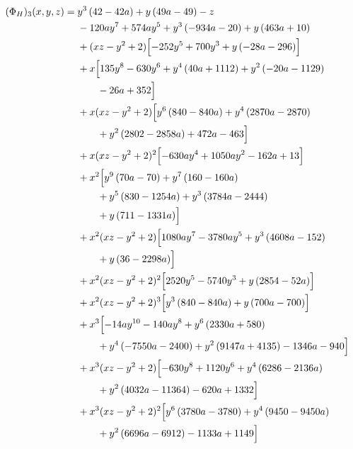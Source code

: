 \begingroup\footnotesize\allowdisplaybreaks[4]

\begin{align*}
(\Phi_H)_3(x,y,z)={}&y^{3} \left(42 - 42 a\right) + y \left(49 a - 49\right) - z\\
&{}- 120 a y^{7} + 574 a y^{5} + y^{3} \left(- 934 a - 20\right) + y \left(463 a + 10\right)\\
&{}+(xz-y^2+2)\Bigl[- 252 y^{5} + 700 y^{3} + y \left(- 28 a - 296\right)\Bigr]\\
&{}+x\Bigl[135 y^{8} - 630 y^{6} + y^{4} \left(40 a + 1112\right) + y^{2} \left(- 20 a - 1129\right)\\
&\qquad - 26 a + 352\Bigr]\\
&{}+x(xz-y^2+2)\Bigl[y^{6} \left(840 - 840 a\right) + y^{4} \left(2870 a - 2870\right)\\
&\qquad + y^{2} \left(2802 - 2858 a\right) + 472 a - 463\Bigr]\\
&{}+x(xz-y^2+2)^{2}\Bigl[- 630 a y^{4} + 1050 a y^{2} - 162 a + 13\Bigr]\\
&{}+x^{2}\Bigl[y^{9} \left(70 a - 70\right) + y^{7} \left(160 - 160 a\right)\\
&\qquad + y^{5} \left(830 - 1254 a\right) + y^{3} \left(3784 a - 2444\right)\\
&\qquad + y \left(711 - 1331 a\right)\Bigr]\\
&{}+x^{2}(xz-y^2+2)\Bigl[1080 a y^{7} - 3780 a y^{5} + y^{3} \left(4608 a - 152\right)\\
&\qquad + y \left(36 - 2298 a\right)\Bigr]\\
&{}+x^{2}(xz-y^2+2)^{2}\Bigl[2520 y^{5} - 5740 y^{3} + y \left(2854 - 52 a\right)\Bigr]\\
&{}+x^{2}(xz-y^2+2)^{3}\Bigl[y^{3} \left(840 - 840 a\right) + y \left(700 a - 700\right)\Bigr]\\
&{}+x^{3}\Bigl[- 14 a y^{10} - 140 a y^{8} + y^{6} \left(2330 a + 580\right)\\
&\qquad + y^{4} \left(- 7550 a - 2400\right) + y^{2} \left(9147 a + 4135\right) - 1346 a - 940\Bigr]\\
&{}+x^{3}(xz-y^2+2)\Bigl[- 630 y^{8} + 1120 y^{6} + y^{4} \left(6286 - 2136 a\right)\\
&\qquad + y^{2} \left(4032 a - 11364\right) - 620 a + 1332\Bigr]\\
&{}+x^{3}(xz-y^2+2)^{2}\Bigl[y^{6} \left(3780 a - 3780\right) + y^{4} \left(9450 - 9450 a\right)\\
&\qquad + y^{2} \left(6696 a - 6912\right) - 1133 a + 1149\Bigr]\\

\end{align*}
